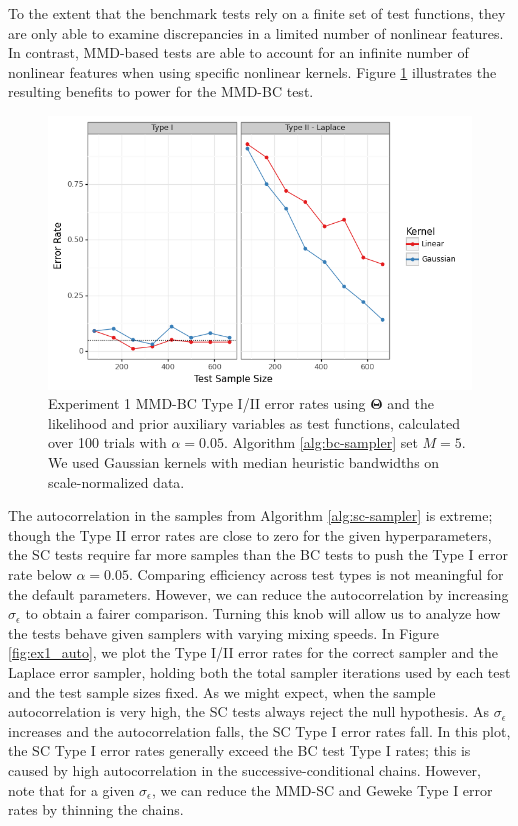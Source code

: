 \documentclass[a4paper,11pt]{article}
\begin{document}
To the extent that the benchmark tests rely on a finite set of test functions, they are only able to examine discrepancies in a limited number of nonlinear features. In contrast, MMD-based tests are able to account for an infinite number of nonlinear features when using specific nonlinear kernels. Figure \ref{fig:ex1_kernel} illustrates the resulting benefits to power for the MMD-BC test. 
\begin{figure}
    \centering
    \includegraphics[width=\textwidth]{figures/gandy_scott_kernel.png}
    \caption{Experiment 1 MMD-BC Type I/II error rates using $\mathbf{\Theta}$ and the likelihood and prior auxiliary variables as test functions, calculated over 100 trials with $\alpha=0.05$. Algorithm \ref{alg:bc-sampler} set $M=5$. We used Gaussian kernels with median heuristic bandwidths on scale-normalized data.}
    \label{fig:ex1_kernel}
\end{figure}

The autocorrelation in the samples from Algorithm \ref{alg:sc-sampler} is extreme; though the Type II error rates are close to zero for the given hyperparameters, the SC tests require far more samples than the BC tests to push the Type I error rate below $\alpha=0.05$. Comparing efficiency across test types is not meaningful for the default parameters. However, we can reduce the autocorrelation by increasing $\sigma_{\epsilon}$ to obtain a fairer comparison. Turning this knob will allow us to analyze how the tests behave given samplers with varying mixing speeds. 
In Figure \ref{fig:ex1_auto}, we plot the Type I/II error rates for the correct sampler and the Laplace error sampler, holding both the total sampler iterations used by each test and the test sample sizes fixed. As we might expect, when the sample autocorrelation is very high, the SC tests always reject the null hypothesis. As $\sigma_{\epsilon}$ increases and the autocorrelation falls, the SC Type I error rates fall. In this plot, the SC Type I error rates generally exceed the BC test Type I rates; this is caused by high autocorrelation in the successive-conditional chains. However, note that for a given $\sigma_{\epsilon}$, we can reduce the MMD-SC and Geweke Type I error rates by thinning the chains.
\end{document}
